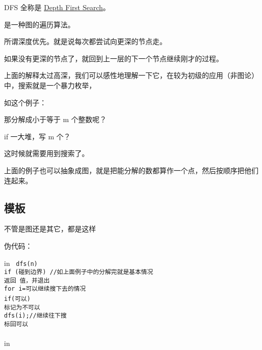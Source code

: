 
DFS 全称是 \href{https://en.wikipedia.org/wiki/Depth-first_search}{Depth First Search}。

是一种图的遍历算法。

所谓深度优先。就是说每次都尝试向更深的节点走。

如果没有更深的节点了，就回到上一层的下一个节点继续刚才的过程。

上面的解释太过高深，我们可以感性地理解一下它，在较为初级的应用（非图论）中，搜索就是一个暴力枚举，

如这个例子：


那分解成小于等于 m 个整数呢？

if 一大堆，写 m 个？

这时候就需要用到搜索了。

上面的例子也可以抽象成图，就是把能分解的数都算作一个点，然后按顺序把他们连起来。

\subsection{模板}

不管是图还是其它，都是这样

伪代码：

 in
\texttt{
dfs(n) {\\  if (碰到边界) //如上面例子中的分解完就是基本情况\\    返回 值，并退出\\  for i=可以继续搜下去的情况\\    if(可以){\\      标记为不可以\\      dfs(i);//继续往下搜\\      标回可以\\    }\\}}
 in

